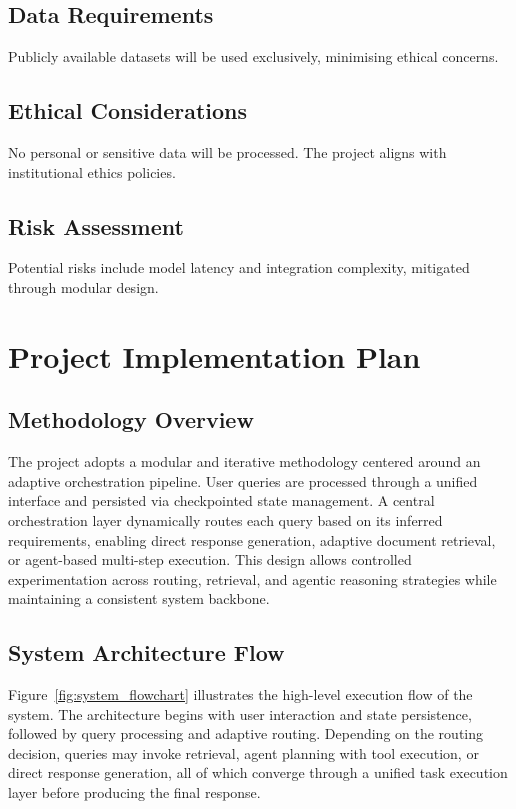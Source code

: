 \documentclass[12pt,a4paper]{article}
\begin{document}
\subsection{Data Requirements}

Publicly available datasets will be used exclusively, minimising ethical concerns.

\subsection{Ethical Considerations}

No personal or sensitive data will be processed. The project aligns with institutional ethics policies.

\subsection{Risk Assessment}

Potential risks include model latency and integration complexity, mitigated through modular design.


\section{Project Implementation Plan}


\subsection{Methodology Overview}

The project adopts a modular and iterative methodology centered around an adaptive orchestration pipeline. 
User queries are processed through a unified interface and persisted via checkpointed state management. 
A central orchestration layer dynamically routes each query based on its inferred requirements, enabling 
direct response generation, adaptive document retrieval, or agent-based multi-step execution. 
This design allows controlled experimentation across routing, retrieval, and agentic reasoning strategies 
while maintaining a consistent system backbone.

\subsection{System Architecture Flow}

Figure~\ref{fig:system_flowchart} illustrates the high-level execution flow of the system. 
The architecture begins with user interaction and state persistence, followed by query processing 
and adaptive routing. Depending on the routing decision, queries may invoke retrieval, agent planning 
with tool execution, or direct response generation, all of which converge through a unified task 
execution layer before producing the final response.
\end{document}
